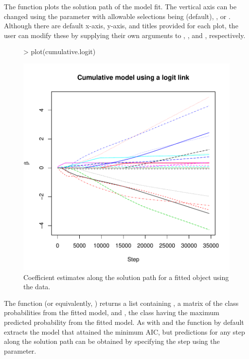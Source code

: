 \documentclass[article, shortclass, nojss]{jss}
\begin{document}
The  function plots the solution path of the model fit. The vertical axis can be changed using the  parameter with allowable selections being  (default), ,  or . Although there are default x-axis, y-axis, and titles provided for each plot, the user can modify these by supplying their own arguments to , , and , respectively.
\begin{figure}[h]
  \begin{center}
\begin{Schunk}
\begin{Sinput}
> plot(cumulative.logit)
\end{Sinput}
\end{Schunk}
\includegraphics{ordinalgmifs-005}
    \caption{Coefficient estimates along the solution path for a fitted  object using the  data.}
  \end{center}
\end{figure}

The  function (or equivalently, ) returns a list containing , a matrix of the class probabilities from the fitted model, and , the class having the maximum predicted probability from the fitted model. As with  and  the  function by default extracts the model that attained the minimum AIC, but predictions for any step along the solution path can be obtained by specifying the step using the  parameter. 
\end{document}
